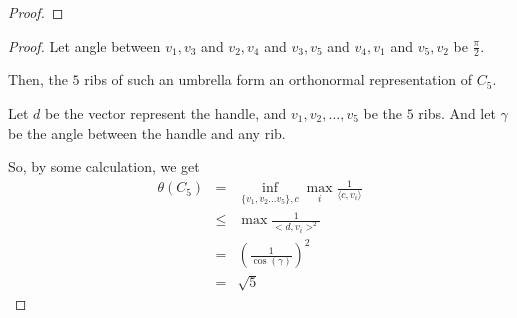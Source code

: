 \begin{frame}
\begin{proof}

      \end{proof}
\end{frame}

\begin{frame}
      \begin{proof}
            Let angle between $v_{1}, v_{3}$ and $v_{2}, v_{4}$ and $v_{3}, v_{5}$ and $v_{4}, v_{1}$ and $v_{5}, v_{2}$ be $\frac{\pi}{2}$.

            Then, the $5$ ribs of such an umbrella form an orthonormal representation of $C_{5}$.

            Let $d$ be the vector represent the handle, and $v_{1},v_{2},\dots,v_{5}$ be the $5$ ribs. And let $\gamma$ be the angle between the handle and any rib.

            So, by some calculation, we get
            \begin{eqnarray}
                  \theta(C_{5}) &=& \inf_{\{v_{1},v_{2} \hdots v_{5}\},c} \max_{i} \frac{1}{\langle c, v_{i} \rangle} \\
                  &\le& \max \frac{1}{<d,v_{i}>^{2}} \\
                  &=& \left(
                        \frac{1}{\cos(\gamma)}
                  \right)^{2} \\
                  &=& \sqrt{5}
            \end{eqnarray}
      \end{proof}
\end{frame}
